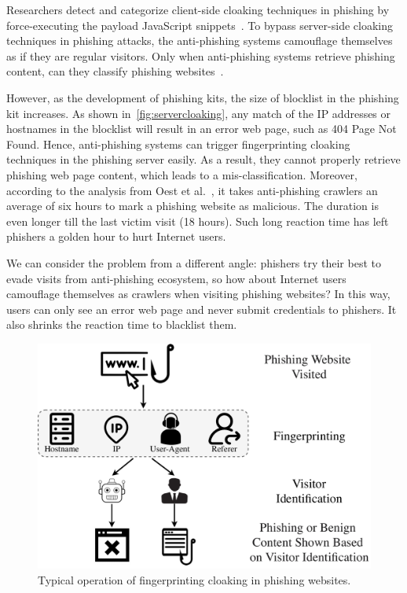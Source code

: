 Researchers detect and categorize client-side cloaking techniques in phishing by force-executing the payload JavaScript snippets~\cite{zhang2021crawlphish}.
To bypass server-side cloaking techniques in phishing attacks, the anti-phishing systems camouflage themselves as if they are regular visitors.
Only when anti-phishing systems retrieve phishing content, can they classify phishing websites~\cite{xiang2011cantina+,whittaker2010large,smartscreen}.

However, as the development of phishing kits, the size of blocklist in the phishing kit increases.
As shown in~\autoref{fig:servercloaking}, any match of the IP addresses or hostnames in the blocklist will result in an error web page, such as 404 Page Not Found.
Hence, anti-phishing systems can trigger fingerprinting cloaking techniques in the phishing server easily.
As a result, they cannot properly retrieve phishing web page content, which leads to a mis-classification.
Moreover, according to the analysis from Oest et al.~\cite{oest2020sunrise}, it takes anti-phishing crawlers an average of six hours to mark a phishing website as malicious.
The duration is even longer till the last victim visit (18 hours).
Such long reaction time has left phishers a golden hour to hurt Internet users.

We can consider the problem from a different angle: phishers try their best to evade visits from anti-phishing ecosystem, so how about Internet users camouflage themselves as crawlers when visiting phishing websites?
In this way, users can only see an error web page and never submit credentials to phishers.
It also shrinks the reaction time to blacklist them.




\begin{figure}
\centering
\includegraphics[width=.9\linewidth]{figs/fp_cloaking.pdf}
\caption{Typical operation of fingerprinting cloaking in phishing websites.}
\label{fig:fp_cloaking}
\end{figure}